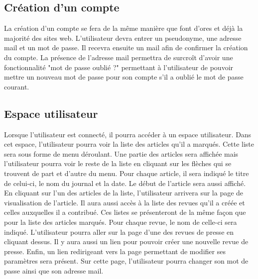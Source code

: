 \subsection{Création d'un compte}
\label{creation_compte}


La création d'un compte se fera de la même manière que font d'ores et déjà la majorité des sites web. L'utilisateur devra entrer un pseudonyme, une adresse mail et un mot de passe. Il recevra ensuite un mail afin de confirmer la création du compte. La présence de l'adresse mail permettra de surcroît d'avoir une fonctionnalité "mot de passe oublié ?" permettant à l'utilisateur de pouvoir mettre un nouveau mot de passe pour son compte s'il a oublié le mot de passe courant.


\subsection{Espace utilisateur}
\label{espace_util}

Lorsque l'utilisateur est connecté, il pourra accéder à un espace utilisateur. Dans cet espace, l'utilisateur pourra voir la liste des articles qu'il a marqués. Cette liste sera sous forme de menu déroulant. Une partie des articles sera affichée mais l'utilisateur pourra voir le reste de la liste en cliquant sur les flèches qui se trouvent de part et d'autre du menu. Pour chaque article, il sera indiqué le titre de celui-ci, le nom du journal et la date. Le début de l'article sera aussi affiché. En cliquant sur l'un des articles de la liste, l'utilisateur arrivera sur la page de visualisation de l'article. Il aura aussi accès à la liste des revues qu'il a créée et celles auxquelles il a contribué. Ces listes se présenteront de la même façon que pour la liste des articles marqués. Pour chaque revue, le nom de celle-ci sera indiqué. L'utilisateur pourra aller sur la page d'une des revues de presse en cliquant dessus. Il y aura aussi un lien pour pouvoir créer une nouvelle revue de presse. 
Enfin, un lien redirigeant vers la page permettant de modifier ses paramètres sera présent. Sur cette page, l'utilisateur pourra changer son mot de passe ainsi que son adresse mail.

